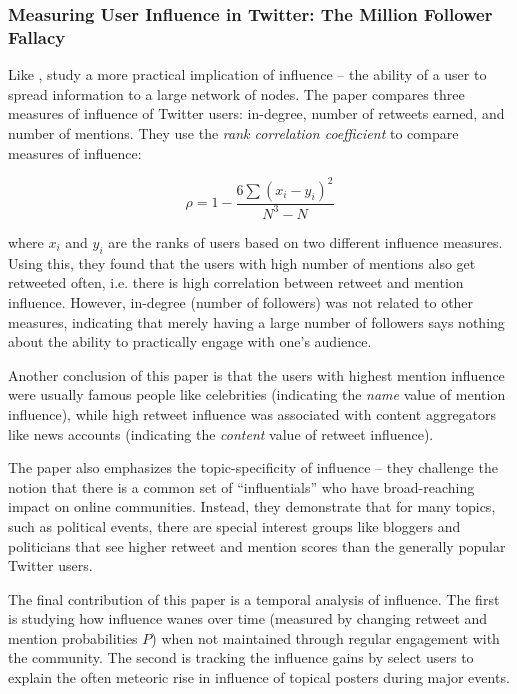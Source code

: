 \documentclass[10pt]{article}
\begin{document}
\subsubsection{Measuring User Influence in Twitter: The Million Follower Fallacy
  \citep{cha2010measuring}}

Like \cite{bakshy2011everyone}, \citet{cha2010measuring} study a more practical
implication of influence -- the ability of a user to spread information to a
large network of nodes. The paper compares three measures of influence of
Twitter users: in-degree, number of retweets earned, and number of mentions.
They use the \textit{rank correlation coefficient} to compare measures of
influence:

\begin{equation}
  \rho = 1 - \frac{6\sum{(x_i - y_i)^2}}{N^3 - N}
\end{equation}

where $x_i$ and $y_i$ are the ranks of users based on two different influence
measures. Using this, they found that the users with high number of mentions
also get retweeted often, i.e. there is high correlation between retweet and
mention influence. However, in-degree (number of followers) was not related to
other measures, indicating that merely having a large number of followers says
nothing about the ability to practically engage with one's audience.

Another conclusion of this paper is that the users with highest mention
influence were usually famous people like celebrities (indicating the
\emph{name} value of mention influence), while high retweet influence was
associated with content aggregators like news accounts (indicating the
\emph{content} value of retweet influence).

The paper also emphasizes the topic-specificity of influence -- they challenge
the notion that there is a common set of ``influentials'' who have
broad-reaching impact on online communities. Instead, they demonstrate that for
many topics, such as political events, there are special interest groups like
bloggers and politicians that see higher retweet and mention scores than the
generally popular Twitter users.

The final contribution of this paper is a temporal analysis of influence. The
first is studying how influence wanes over time (measured by changing retweet
and mention probabilities $P$) when not maintained through regular engagement
with the community. The second is tracking the influence gains by select users
to explain the often meteoric rise in influence of topical posters during major
events.
\end{document}
